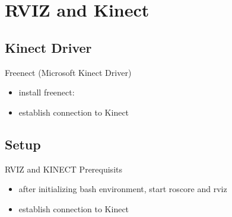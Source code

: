 \documentclass{beamer}
\begin{document}

\section{RVIZ and Kinect}
\subsection{Kinect Driver}
\begin{frame}{Freenect (Microsoft Kinect Driver)}	

	\begin{itemize}
	
		\item install freenect: \\
			
		
		\item establish connection to Kinect \\
			
		
	\end{itemize}

\end{frame}


\subsection{Setup}
\begin{frame}{RVIZ and KINECT Prerequisits}	

\begin{itemize}

	\item after initializing bash environment, start roscore and rviz
		 	
	
	
	\item establish connection to Kinect \\
		 
	
\end{itemize}
\end{frame}
\end{document}
